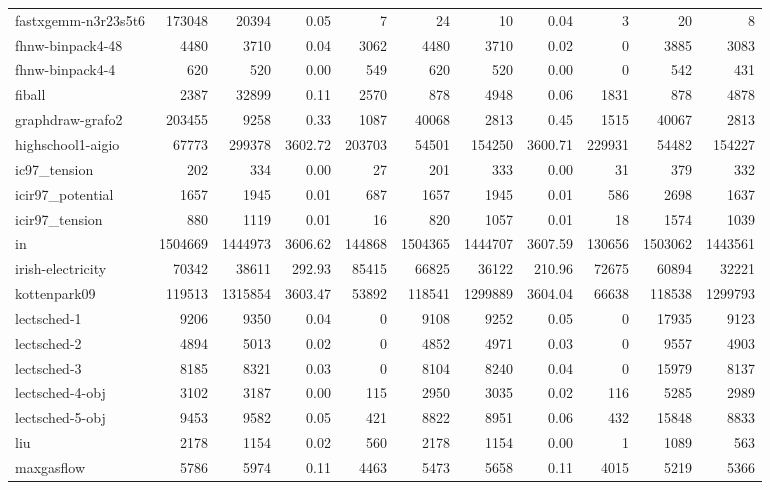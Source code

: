 \documentclass[pdflatex,sn-mathphys-num]{sn-jnl}%
\theoremstyle{thmstyleone}%
\theoremstyle{thmstylethree}%
\theoremstyle{thmstyletwo}%
\begin{document}
\begin{appendices}
{\begin{longtable}{l|r|r|r|r|r|r|r|r|r|r}
fastxgemm-n3r23s5t6            & 173048 & 20394 & 0.05 & 7 & 24 & 10 & 0.04 & 3 & 20 & 8\\
fhnw-binpack4-48               & 4480 & 3710 & 0.04 & 3062 & 4480 & 3710 & 0.02 & 0 & 3885 & 3083\\
fhnw-binpack4-4                & 620 & 520 & 0.00 & 549 & 620 & 520 & 0.00 & 0 & 542 & 431\\
fiball                         & 2387 & 32899 & 0.11 & 2570 & 878 & 4948 & 0.06 & 1831 & 878 & 4878\\
graphdraw-grafo2               & 203455 & 9258 & 0.33 & 1087 & 40068 & 2813 & 0.45 & 1515 & 40067 & 2813\\
highschool1-aigio              & 67773 & 299378 & 3602.72 & 203703 & 54501 & 154250 & 3600.71 & 229931 & 54482 & 154227\\
ic97\_tension                   & 202 & 334 & 0.00 & 27 & 201 & 333 & 0.00 & 31 & 379 & 332\\
icir97\_potential               & 1657 & 1945 & 0.01 & 687 & 1657 & 1945 & 0.01 & 586 & 2698 & 1637\\
icir97\_tension                 & 880 & 1119 & 0.01 & 16 & 820 & 1057 & 0.01 & 18 & 1574 & 1039\\
in                             & 1504669 & 1444973 & 3606.62 & 144868 & 1504365 & 1444707 & 3607.59 & 130656 & 1503062 & 1443561\\
irish-electricity              & 70342 & 38611 & 292.93 & 85415 & 66825 & 36122 & 210.96 & 72675 & 60894 & 32221\\
kottenpark09                   & 119513 & 1315854 & 3603.47 & 53892 & 118541 & 1299889 & 3604.04 & 66638 & 118538 & 1299793\\
lectsched-1                    & 9206 & 9350 & 0.04 & 0 & 9108 & 9252 & 0.05 & 0 & 17935 & 9123\\
lectsched-2                    & 4894 & 5013 & 0.02 & 0 & 4852 & 4971 & 0.03 & 0 & 9557 & 4903\\
lectsched-3                    & 8185 & 8321 & 0.03 & 0 & 8104 & 8240 & 0.04 & 0 & 15979 & 8137\\
lectsched-4-obj                & 3102 & 3187 & 0.00 & 115 & 2950 & 3035 & 0.02 & 116 & 5285 & 2989\\
lectsched-5-obj                & 9453 & 9582 & 0.05 & 421 & 8822 & 8951 & 0.06 & 432 & 15848 & 8833\\
liu                            & 2178 & 1154 & 0.02 & 560 & 2178 & 1154 & 0.00 & 1 & 1089 & 563\\
maxgasflow                     & 5786 & 5974 & 0.11 & 4463 & 5473 & 5658 & 0.11 & 4015 & 5219 & 5366\\

\end{longtable}}
\end{appendices}
\end{document}
